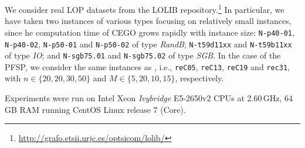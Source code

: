 \documentclass[sigconf,dvipsnames]{acmart}
\begin{document}
%
We consider real LOP datasets from the LOLIB
repository.\footnote{\url{http://grafo.etsii.urjc.es/optsicom/lolib/}} In
particular, we have taken two instances of various types focusing on relatively
small instances, since he computation time of CEGO grows rapidly with instance
size: \texttt{N-p40-01}, \texttt{N-p40-02}, \texttt{N-p50-01} and
\texttt{N-p50-02} of type \emph{RandB}; \texttt{N-t59d11xx} and
\texttt{N-t59b11xx} of type \emph{IO}; and \texttt{N-sgb75.01} and
\texttt{N-sgb75.02} of type \emph{SGB}.
In the case of the PFSP, we consider the same instances as
\citet{ZaeStoBar2014:ppsn}, i.e., \texttt{reC05}, \texttt{reC13},
\texttt{reC19} and \texttt{rec31}, with $n \in \{20, 20, 30, 50\}$ and $M \in \{5, 20, 10, 15\}$, respectively.


Experiments were run on Intel Xeon \emph{Ivybridge} E5-2650v2 CPUs at
2.60\,GHz, 64\,GB RAM running CentOS Linux release 7 (Core).
\end{document}
